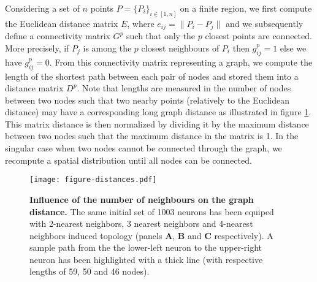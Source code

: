 Considering a set of $n$ points $P = \{P_i\}_{i \in [1,n]}$ on a finite region,
we first compute the Euclidean distance matrix $E$, where $e_{ij} = \lVert P_i - P_j \rVert$ 
and we subsequently define a connectivity matrix $G^{p}$
such that only the $p$ closest points
are connected. More precisely, if $P_j$ is among the $p$ closest neighbours of
$P_i$ then $g^p_{ij} = 1$ else we have $g^p_{ij} = 0$.
From this connectivity
matrix representing a graph, we compute the length of the shortest path between
each pair of nodes and stored them into a distance matrix $D^p$. Note that
lengths are measured in the number of nodes between two nodes such that two
nearby points (relatively to the Euclidean distance) may have a corresponding
long graph distance as illustrated in figure \ref{fig:topology}. This matrix
distance is then normalized by dividing it by the maximum distance between two
nodes such that the maximum distance in the matrix is 1. In the singular case
when two nodes cannot be connected through the graph, we recompute a spatial
distribution until all nodes can be connected.
\begin{figure}
  \texttt{[image: figure-distances.pdf]}
  \caption{\textbf{Influence of the number of neighbours on the graph
    distance.} The same initial set of 1003 neurons has been equiped with
    2-nearest neighbors, 3 nearest neighbors and 4-nearest neighbors induced
    topology (panels \textbf{A}, \textbf{B} and \textbf{C} respectively). A
    sample path from the the lower-left neuron to the upper-right neuron has
    been highlighted with a thick line (with respective lengths of 59, 50 and
    46 nodes).}
  \label{fig:topology}
\end{figure}

